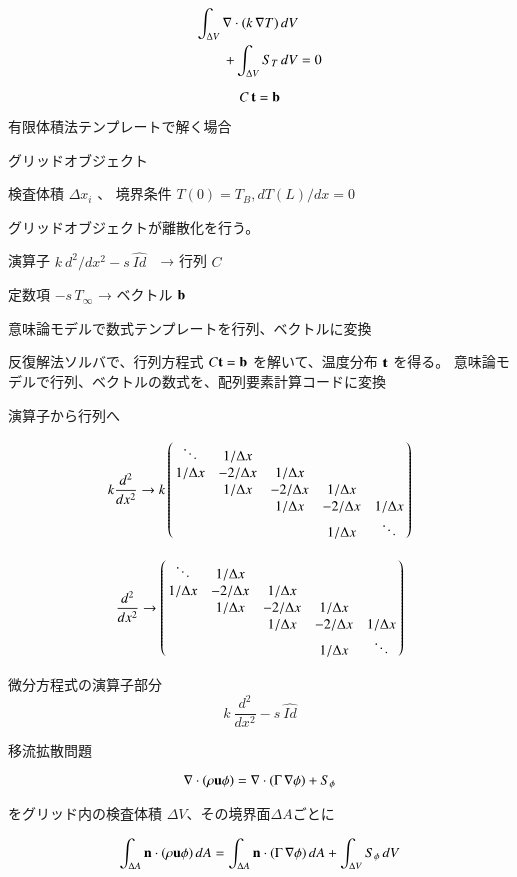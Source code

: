 \documentclass[a4j,11pt]{jarticle}
\begin{document}
\begin{eqnarray}
 \int_{\Delta V} {\bf \nabla} \cdot ( k \,  {\bf \nabla} T )\, dV & \\
+  \int_{\Delta V} S_T \,dV &  = 0  \\ 
\end{eqnarray}

 
\medskip

\[ C \,{\bf t} = {\bf b} \]


有限体積法テンプレートで解く場合

    グリッドオブジェクト

        検査体積 \( \Delta x_i\) 、 境界条件 \( T(0) = T_B , d T(L) / dx = 0 \)

    グリッドオブジェクトが離散化を行う。

        演算子 \(  k\ d^2 / dx^2 - s\ \hat{Id} \)　→ 行列 \(C\)

        定数項 \( - s \, T_\infty \) → ベクトル \( \bf b \)

            意味論モデルで数式テンプレートを行列、ベクトルに変換

    反復解法ソルバで、行列方程式 \( C {\bf t} = {\bf b} \) を解いて、温度分布 \( \bf t\) を得る。
        意味論モデルで行列、ベクトルの数式を、配列要素計算コードに変換



演算子から行列へ
 

\[ k \frac{ d^2 }{ dx^2} \rightarrow  k \left( \begin{array}{@{\,}ccccc@{\,}} \ddots & 1 / \Delta x & & & \\ 1 / \Delta x & - 2 / \Delta x & 1 / \Delta x & & \\ & 1 / \Delta x & - 2 / \Delta x & 1 / \Delta x & \\ & & 1 / \Delta x & - 2 / \Delta x & 1 / \Delta x \\ & & & 1 / \Delta x & \ddots \end{array} \right)  \]


\[  \frac{ d^2 }{ dx^2} \rightarrow  \left( \begin{array}{@{\,}ccccc@{\,}} \ddots & 1 / \Delta x & & & \\ 1 / \Delta x & - 2 / \Delta x & 1 / \Delta x & & \\ & 1 / \Delta x & - 2 / \Delta x & 1 / \Delta x & \\ & & 1 / \Delta x & - 2 / \Delta x & 1 / \Delta x \\ & & & 1 / \Delta x & \ddots \end{array} \right)  \]


微分方程式の演算子部分
 \[  k\ \frac{d^2}{dx^2} - s\ \hat{Id} \]
 


移流拡散問題

\[ {\bf \nabla} \cdot ( \rho {\bf u} \phi) = {\bf \nabla} \cdot ( \Gamma \, {\bf \nabla} \phi )  + S_\phi \]

をグリッド内の検査体積 \(\Delta V\)、その境界面\(\Delta A\)ごとに

\[ \int_{\Delta A} {\bf n} \cdot ( \rho {\bf u} \phi )\, dA = \int_{\Delta A} {\bf n} \cdot ( \Gamma \,  {\bf \nabla} \phi )\, dA + \int_{\Delta V} S_\phi \,dV  \]
 
\end{document}
